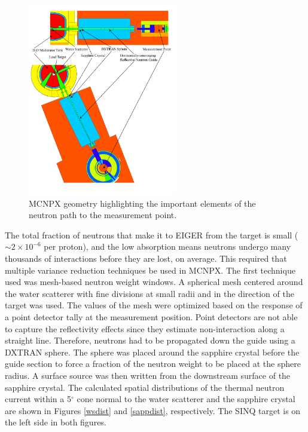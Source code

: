 \documentclass[a4paper,
              ]{jacow}
\begin{document}
\begin{figure}[!htb]
   \centering
   \includegraphics*[trim = 0mm 25mm 0mm 10mm, width=65mm]{graphics/geom.pdf}
   \caption{MCNPX geometry highlighting the important elements of the neutron path to the measurement point.}
   \label{geom}
\end{figure}

The total fraction of neutrons that make it to EIGER from the target is small ($\sim 2 \times 10^{-6}$ per proton), and the low absorption means neutrons undergo many thousands of interactions before they are lost, on average.  This required that multiple variance reduction techniques be used in MCNPX.  The first technique used was mesh-based neutron weight windows.  A spherical mesh centered around the water scatterer with fine divisions at small radii and in the direction of the target was used.  The values of the mesh were optimized based on the response of a point detector tally at the measurement position.  Point detectors are not able to capture the reflectivity effects since they estimate non-interaction along a straight line.  Therefore, neutrons had to be propagated down the guide using a DXTRAN sphere.  The sphere was placed around the sapphire crystal before the guide section to force a fraction of the neutron weight to be placed at the sphere radius.  A surface source was then written from the downstream surface of the sapphire crystal.  The calculated spatial distributions of the thermal neutron current within a 5$^\circ$ cone normal to the water scatterer and the sapphire crystal are shown in Figures \ref{wsdist} and \ref{sappdist}, respectively.  The SINQ target is on the left side in both figures.
\end{document}
